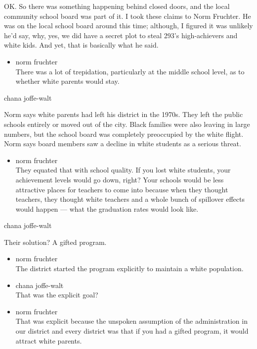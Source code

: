 OK. So there was something happening behind closed doors, and the local
community school board was part of it. I took these claims to Norm
Fruchter. He was on the local school board around this time; although, I
figured it was unlikely he'd say, why, yes, we did have a secret plot to
steal 293's high-achievers and white kids. And yet, that is basically
what he said.

\begin{itemize}
\tightlist
\item
  norm fruchter\\
  There was a lot of trepidation, particularly at the middle school
  level, as to whether white parents would stay.
\end{itemize}

chana joffe-walt

Norm says white parents had left his district in the 1970s. They left
the public schools entirely or moved out of the city. Black families
were also leaving in large numbers, but the school board was completely
preoccupied by the white flight. Norm says board members saw a decline
in white students as a serious threat.

\begin{itemize}
\tightlist
\item
  norm fruchter\\
  They equated that with school quality. If you lost white students,
  your achievement levels would go down, right? Your schools would be
  less attractive places for teachers to come into because when they
  thought teachers, they thought white teachers and a whole bunch of
  spillover effects would happen --- what the graduation rates would
  look like.
\end{itemize}

chana joffe-walt

Their solution? A gifted program.

\begin{itemize}
\item
  norm fruchter\\
  The district started the program explicitly to maintain a white
  population.
\item
  chana joffe-walt\\
  That was the explicit goal?
\item
  norm fruchter\\
  That was explicit because the unspoken assumption of the
  administration in our district and every district was that if you had
  a gifted program, it would attract white parents.
\end{itemize}


